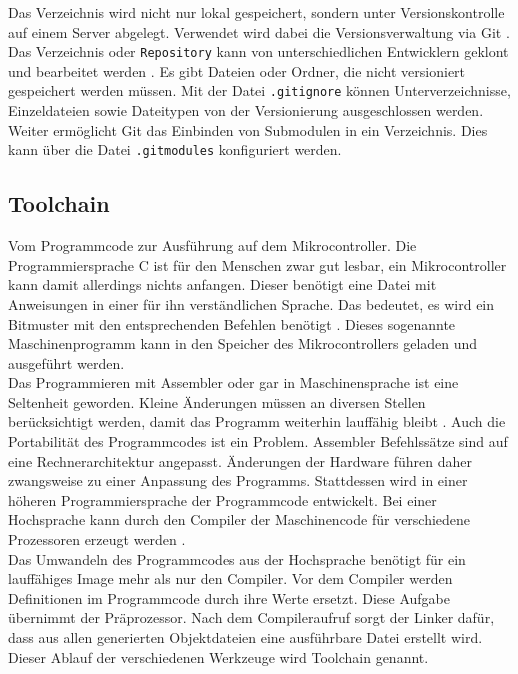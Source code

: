 Das Verzeichnis wird nicht nur lokal gespeichert, sondern unter Versionskontrolle auf einem Server abgelegt.
Verwendet wird dabei die Versionsverwaltung via Git \cite{inet:git}.
Das Verzeichnis oder \verb*|Repository| kann von unterschiedlichen Entwicklern geklont und bearbeitet werden \cite{Preisel2017-eu}.
Es gibt Dateien oder Ordner, die nicht versioniert gespeichert werden müssen.
Mit der Datei \verb*|.gitignore| können Unterverzeichnisse, Einzeldateien sowie Dateitypen von der Versionierung ausgeschlossen werden.
Weiter ermöglicht Git das Einbinden von Submodulen in ein Verzeichnis.
Dies kann über die Datei \verb*|.gitmodules| konfiguriert werden.

\subsection{Toolchain}\label{fig:toolchain}
Vom Programmcode zur Ausführung auf dem Mikrocontroller.
Die Programmiersprache C ist für den Menschen zwar gut lesbar, ein Mikrocontroller kann damit allerdings nichts anfangen.
Dieser benötigt eine Datei mit Anweisungen in einer für ihn verständlichen Sprache.
Das bedeutet, es wird ein Bitmuster mit den entsprechenden Befehlen benötigt \cite{Flik2004-dl}.
Dieses sogenannte Maschinenprogramm kann in den Speicher des Mikrocontrollers geladen und ausgeführt werden. \\

Das Programmieren mit Assembler oder gar in Maschinensprache ist eine Seltenheit geworden.
Kleine Änderungen müssen an diversen Stellen berücksichtigt werden, damit das Programm weiterhin lauffähig bleibt \cite{Flik2004-dl}.
Auch die Portabilität des Programmcodes ist ein Problem.
Assembler Befehlssätze sind auf eine Rechnerarchitektur angepasst.
Änderungen der Hardware führen daher zwangsweise zu einer Anpassung des Programms.
Stattdessen wird in einer höheren Programmiersprache der Programmcode entwickelt.
Bei einer Hochsprache kann durch den Compiler der Maschinencode für verschiedene Prozessoren erzeugt werden \cite{Wust2010-jg}.\\

Das Umwandeln des Programmcodes aus der Hochsprache benötigt für ein lauffähiges Image mehr als nur den Compiler.
Vor dem Compiler werden Definitionen im Programmcode durch ihre Werte ersetzt.
Diese Aufgabe übernimmt der Präprozessor.
Nach dem Compileraufruf sorgt der Linker dafür, dass aus allen generierten Objektdateien eine ausführbare Datei erstellt wird.
Dieser Ablauf der verschiedenen Werkzeuge wird Toolchain genannt. \\

